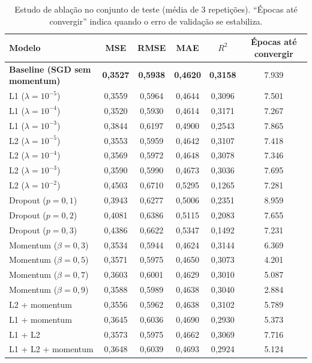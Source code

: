 \documentclass[11pt,a4paper]{article}
\begin{document}
\begin{table}[H]
\centering
\small
\caption{Estudo de ablação no conjunto de teste (média de 3 repetições). ``Épocas até convergir'' indica quando o erro de validação se estabiliza.}
\label{tab:ablation_metrics}
\begin{tabularx}{\textwidth}{Xccccc}
\toprule
\textbf{Modelo} & \textbf{MSE} & \textbf{RMSE} & \textbf{MAE} & \textbf{$R^2$} & \textbf{Épocas até convergir} \\
\midrule
\textbf{Baseline (SGD sem momentum)} & \textbf{0,3527} & \textbf{0,5938} & \textbf{0,4620} & \textbf{0,3158} & 7.939 \\
\midrule
L1 ($\lambda = 10^{-5}$) & 0,3559 & 0,5964 & 0,4644 & 0,3096 & 7.501 \\
L1 ($\lambda = 10^{-4}$) & 0,3520 & 0,5930 & 0,4614 & 0,3171 & 7.267 \\
L1 ($\lambda = 10^{-3}$) & 0,3844 & 0,6197 & 0,4900 & 0,2543 & 7.865 \\
L2 ($\lambda = 10^{-5}$) & 0,3553 & 0,5959 & 0,4642 & 0,3107 & 7.418 \\
L2 ($\lambda = 10^{-4}$) & 0,3569 & 0,5972 & 0,4648 & 0,3078 & 7.346 \\
L2 ($\lambda = 10^{-3}$) & 0,3590 & 0,5990 & 0,4673 & 0,3036 & 7.695 \\
L2 ($\lambda = 10^{-2}$) & 0,4503 & 0,6710 & 0,5295 & 0,1265 & 7.281 \\
Dropout ($p = 0{,}1$) & 0,3943 & 0,6277 & 0,5006 & 0,2351 & 8.959 \\
Dropout ($p = 0{,}2$) & 0,4081 & 0,6386 & 0,5115 & 0,2083 & 7.655 \\
Dropout ($p = 0{,}3$) & 0,4386 & 0,6622 & 0,5347 & 0,1492 & 7.231 \\
Momentum ($\beta = 0{,}3$) & 0,3534 & 0,5944 & 0,4624 & 0,3144 & 6.369 \\
Momentum ($\beta = 0{,}5$) & 0,3571 & 0,5975 & 0,4650 & 0,3073 & 4.201 \\
Momentum ($\beta = 0{,}7$) & 0,3603 & 0,6001 & 0,4629 & 0,3010 & 5.087 \\
Momentum ($\beta = 0{,}9$) & 0,3588 & 0,5989 & 0,4638 & 0,3040 & 2.884 \\
L2 + momentum & 0,3556 & 0,5962 & 0,4638 & 0,3102 & 5.789 \\
L1 + momentum & 0,3645 & 0,6036 & 0,4690 & 0,2930 & 5.373 \\
L1 + L2 & 0,3573 & 0,5975 & 0,4662 & 0,3069 & 7.716 \\
L1 + L2 + momentum & 0,3648 & 0,6039 & 0,4693 & 0,2924 & 5.124 \\
\bottomrule
\end{tabularx}
\end{table}
\end{document}
